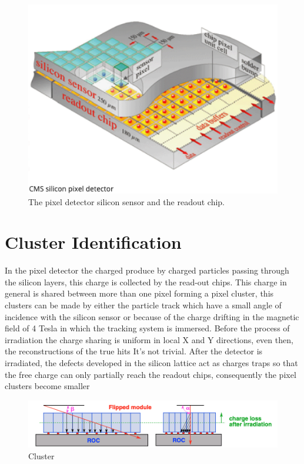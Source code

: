 \begin{figure}[H]
    \centering
    \includegraphics[height=0.55\textwidth, width=1\textwidth]{PixelSensor.png}
    \caption{The pixel detector silicon sensor and the readout chip.}
    \label{fig:sensor}
\end{figure}

\section{Cluster Identification}

In the pixel detector the charged produce by charged particles passing through the silicon layers, this charge is collected by the read-out chips. This charge in general is shared between more than one pixel forming a pixel cluster, this clusters can be made by either the particle track which have a small angle of incidence with the silicon sensor or because of the charge drifting in the magnetic field of 4 Tesla in which the tracking system is immersed. Before the process of irradiation the charge sharing is uniform in local X and Y directions, even then, the reconstructions of the true hits It's not trivial. After the detector is irradiated, the defects developed in the silicon lattice act as charges traps so that the free charge can only partially reach the readout chips, consequently the pixel clusters become smaller \cite{cluster1}

\begin{figure}[h]
    \centering
    \includegraphics[width=1\textwidth]{cluster3.png}
    \caption{Cluster}
    \label{fig:cluster}
\end{figure}

